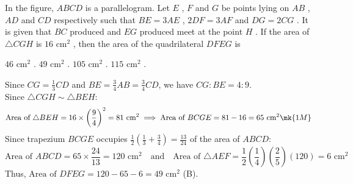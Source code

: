 \question In the figure, $ABCD$ is a parallelogram. Let $E$ , $F$ and $G$ be points lying on $AB$ , $AD$ and $CD$ respectively such that $BE = 3AE$ , $2DF = 3AF$ and $DG = 2CG$ . It is given that $BC$ produced and $EG$ produced meet at the point $H$ . If the area of $\triangle CGH$ is $16\text{ cm}^2$ , then the area of the quadrilateral $DFEG$ is

\begin{minipage}{0.45\textwidth}
\begin{choices}
    \choice $46\text{ cm}^2$ .
    \correctchoice $49\text{ cm}^2$ .
    \choice $105\text{ cm}^2$ .
    \choice $115\text{ cm}^2$ .
\end{choices}
\end{minipage}
\begin{minipage}{0.52\textwidth}
\centering
{}
\end{minipage}
\begin{solution}
Since $CG = \frac{1}{3}CD$ and $BE = \frac{3}{4}AB = \frac{3}{4}CD$, we have $CG : BE = 4 : 9$. \\
Since $\triangle CGH \sim \triangle BEH$:
\[ \text{Area of } \triangle BEH = 16 \times \left(\frac{9}{4}\right)^2 = 81\text{ cm}^2 \implies \text{Area of } BCGE = 81 - 16 = 65\text{ cm}^2 \mk{1M} \]
Since trapezium $BCGE$ occupies $\frac{1}{2}\left(\frac{1}{3} + \frac{3}{4}\right) = \frac{13}{24}$ of the area of $ABCD$:
\[ \text{Area of } ABCD = 65 \times \frac{24}{13} = 120\text{ cm}^2 \quad \text{and} \quad \text{Area of } \triangle AEF = \frac{1}{2}\left(\frac{1}{4}\right)\left(\frac{2}{5}\right)(120) = 6\text{ cm}^2 \]
Thus, $\text{Area of } DFEG = 120 - 65 - 6 = 49\text{ cm}^2$ (B). 
\end{solution}